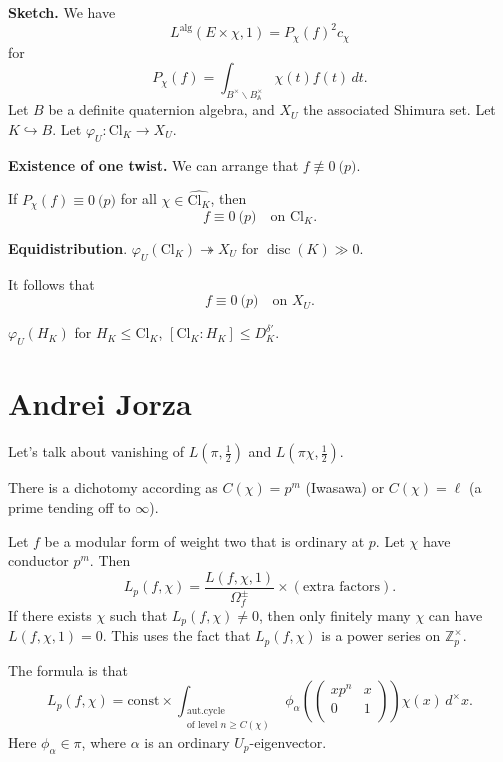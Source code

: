 \documentclass[reqno]{amsart} 
\begin{document}
\textbf{Sketch.}  We have
\begin{equation*}
  L^{\mathrm{alg}}(E \times \chi, 1) = P_\chi(f)^2 c_\chi
\end{equation*}
for
\begin{equation*}
  P_\chi(f) = \int_{B^\times \backslash B^\times_{\mathbb{A}}} \chi(t) f(t) \, d t.
\end{equation*}
Let $B$ be a definite quaternion algebra, and $X_U$ the associated Shimura set.  Let $K \hookrightarrow B$.  Let $\varphi_U : \mathrm{Cl}_K \rightarrow X_U$.

\textbf{Existence of one twist.}  We can arrange that $f \not \equiv 0 \pod{p}$.

If $P_\chi(f) \equiv 0 \pod{p}$ for all $\chi \in \widehat{\mathrm{Cl}_K}$, then
\begin{equation*}
  f \equiv 0 \pod{p} \quad \text{on } \mathrm{Cl}_K.
\end{equation*}

\textbf{Equidistribution}. $\varphi_U(\mathrm{Cl}_K) \twoheadrightarrow X_U$ for $\operatorname{disc}(K) \gg 0$.

It follows that
\begin{equation*}
  f \equiv 0 \pod{p}\quad \text{on } X_U.
\end{equation*}

$\varphi_U(H_K)$ for $H_K \leq \mathrm{Cl}_K$, $[\mathrm{Cl}_K : H_K] \leq D_K^{\delta '}$.

\section{Andrei Jorza}\label{sec:cnfhlpuvgp}
Let's talk about vanishing of $L(\pi, \tfrac{1}{2})$ and $L(\pi \chi, \tfrac{1}{2})$.

There is a dichotomy according as $C(\chi) = p^m$ (Iwasawa) or $C(\chi) = \ell$ (a prime tending off to $\infty$).

Let $f$ be a modular form of weight two that is ordinary at $p$.  Let $\chi$ have conductor $p^m$.  Then
\begin{equation*}
  L_p(f, \chi) = \frac{L(f, \chi, 1)}{\Omega_f^{\pm}}
  \times(\text{extra factors}).
\end{equation*}
If there exists $\chi$ such that $L_p(f, \chi) \neq 0$, then only finitely many $\chi$ can have $L(f, \chi, 1) = 0$.  This uses the fact that $L_p(f, \chi)$ is a power series on $\mathbb{Z}_p^\times$.

The formula is that
\begin{equation*}
  L_p(f, \chi) = \mathrm{const} \times \int_{
    \substack{
      \mathrm{aut. cycle}  \\
      \text{of level } n \geq C(\chi)
    }
  } \phi_\alpha \left(
    \begin{pmatrix}
      x p^n  & x \\
      0 & 1 \\
    \end{pmatrix} \right) \chi(x) \,d^\times x.
\end{equation*}
Here $\phi_\alpha \in \pi$, where $\alpha$ is an ordinary $U_p$-eigenvector.
\end{document}
